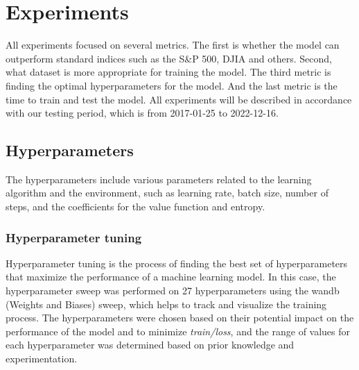 \documentclass[../xlapes02]{subfiles}
\begin{document}
    \section{Experiments}\label{sec:experiments}
    All experiments focused on several metrics. The first is whether the model can outperform standard indices such as the S\&P 500, DJIA and others. Second, what dataset is more appropriate for training the model. The third metric is finding the optimal hyperparameters for the model. And the last metric is the time to train and test the model. All experiments will be described in accordance with our testing period, which is from 2017-01-25 to 2022-12-16.

    \subsection{Hyperparameters}\label{subsec:hyperparameters}
    The hyperparameters include various parameters related to the learning algorithm and the environment, such as learning rate, batch size, number of steps, and the coefficients for the value function and entropy.

    \subsubsection{Hyperparameter tuning}
    Hyperparameter tuning is the process of finding the best set of hyperparameters that maximize the performance of a machine learning model. In this case, the hyperparameter sweep was performed on 27 hyperparameters using the wandb (Weights and Biases) sweep, which helps to track and visualize the training process. The hyperparameters were chosen based on their potential impact on the performance of the model and to minimize \emph{train/loss}, and the range of values for each hyperparameter was determined based on prior knowledge and experimentation.
\end{document}
